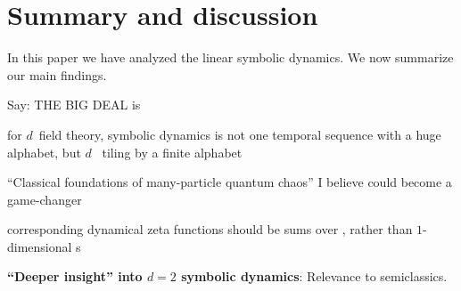 
\section{Summary and discussion}
\label{s:summary}

In this paper we have analyzed the {\catlatt}  
linear symbolic dynamics. We now summarize our main findings.

     {
Say: THE BIG DEAL is

for $d$\dmn\ field theory, symbolic dynamics is not one temporal sequence
with a huge alphabet, but $d$\dmn\ {\spt} tiling by a finite alphabet

``Classical foundations of many-particle
quantum chaos'' I believe could become a game-changer

corresponding dynamical zeta functions
should be sums over {\twots}, rather than $1$-dimensional \po s
    }

     {
{\bf ``Deeper insight'' into $d=2$ symbolic dynamics}:
Relevance to semiclassics.
    }

